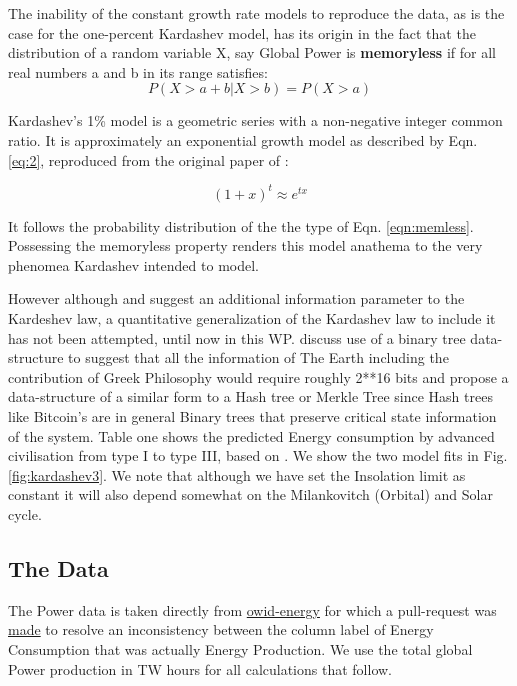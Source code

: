 \documentclass[final,5p,times,twocolumn,authoryear]{elsarticle}
\begin{document}
The inability of the constant growth rate models to reproduce the data, as is the case for the one-percent Kardashev model, has its origin in the fact that the distribution of a random variable X, say Global Power is \textbf{memoryless} if for all real numbers a and b in its range satisfies:
\begin{equation}
P(X>a +b|X>b)=P(X>a)
\label{eqn:memless}
\end{equation}

Kardashev's 1\% model is a geometric series with a non-negative integer common ratio. It is approximately an exponential growth model as described by Eqn. \ref{eq:2}, reproduced from the original paper of \cite{kar64}:

\begin{equation}
(1+x)^t \approx e^{tx}
\label{eq:2}
\end{equation}

It follows the probability distribution of the the type of Eqn. \ref{eqn:memless}. Possessing the memoryless property renders this model anathema to the very phenomea Kardashev intended to model.

 However although \cite{sagan73} and \cite{kar64} suggest an additional information parameter to the Kardeshev law, a quantitative generalization of the Kardashev law to include it has not been attempted, until now in this WP.  \cite{sagan73} discuss use of a binary tree data-structure to suggest that all the information of The Earth including the contribution of Greek Philosophy would require roughly 2**16 bits and propose a data-structure of a similar form to a Hash tree or Merkle Tree since Hash trees like Bitcoin's are in general Binary trees that preserve critical state information of the system. Table one shows the predicted Energy consumption by advanced civilisation from type I to type III, based on \cite{kar64}. We show the two model fits in Fig. \ref{fig:kardashev3}. We note that although we have set the Insolation limit as constant it will also depend somewhat on the Milankovitch (Orbital) and Solar cycle. 

\subsection{The Data}
\label{subsec: data}

The Power data is taken directly from \href{https://github.com/owid/energy-data}{owid-energy} for which a pull-request was \href{https://github.com/owid/energy-data/pull/23}{made} to resolve an inconsistency between the column label of Energy Consumption that was actually Energy Production. We use the total global Power production in TW hours for all calculations that follow.
\end{document}
